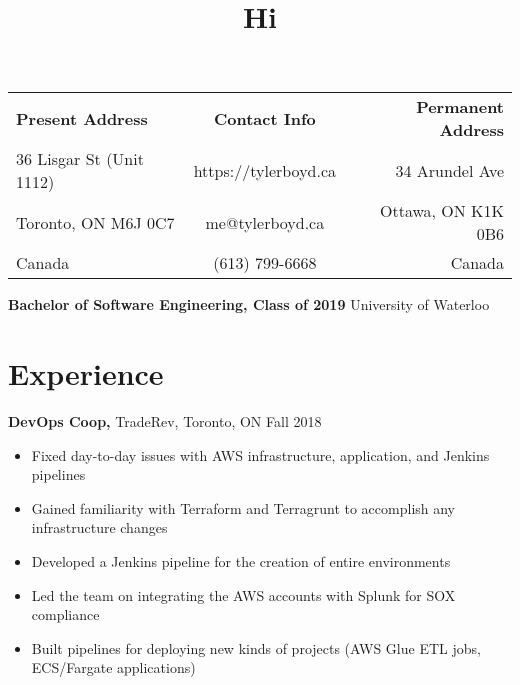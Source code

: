 \documentclass[line, centered]{res}
\begin{document}
 
 
\title{Hi}

 
\begin{resume} 
 
\hspace{0.5cm} \begin{tabularx}{\textwidth}{l c r}
	{\bf \large Present Address} & {\bf \large Contact Info} & {\bf \large Permanent Address} \\
	36 Lisgar St  (Unit 1112) & https://tylerboyd.ca & 34 Arundel Ave \\
	Toronto, ON M6J 0C7 & me@tylerboyd.ca & Ottawa, ON K1K 0B6\\
	Canada			 & (613) 799-6668 & Canada\\

\end{tabularx}
 
\textbf{Bachelor of Software Engineering, Class of 2019} \hfill University of Waterloo
 

\section{Experience}
 {\bf DevOps Coop,} TradeRev, Toronto, ON \hfill Fall 2018\\[-8pt]
 \begin{itemize} \itemsep -2pt  %
 \item Fixed day-to-day issues with AWS infrastructure, application, and Jenkins pipelines
 \item Gained familiarity with Terraform and Terragrunt to accomplish any infrastructure changes
 \item Developed a Jenkins pipeline for the creation of entire environments
 \item Led the team on integrating the AWS accounts with Splunk for SOX compliance
 \item Built pipelines for deploying new kinds of projects (AWS Glue ETL jobs, ECS/Fargate applications)
 \end{itemize}


\end{resume}
\end{document}

